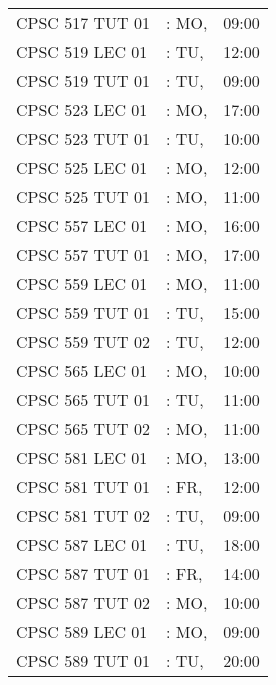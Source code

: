 \documentclass[11pt]{article}
\begin{document}
\begin{longtable}{l l r}
CPSC 517 TUT 01               &\hspace*{1.5cm}: MO,& 09:00\tabularnewline
CPSC 519 LEC 01               &\hspace*{1.5cm}: TU,& 12:00\tabularnewline
CPSC 519 TUT 01               &\hspace*{1.5cm}: TU,& 09:00\tabularnewline
CPSC 523 LEC 01               &\hspace*{1.5cm}: MO,& 17:00\tabularnewline
CPSC 523 TUT 01               &\hspace*{1.5cm}: TU,& 10:00\tabularnewline
CPSC 525 LEC 01               &\hspace*{1.5cm}: MO,& 12:00\tabularnewline
CPSC 525 TUT 01               &\hspace*{1.5cm}: MO,& 11:00\tabularnewline
CPSC 557 LEC 01               &\hspace*{1.5cm}: MO,& 16:00\tabularnewline
CPSC 557 TUT 01               &\hspace*{1.5cm}: MO,& 17:00\tabularnewline
CPSC 559 LEC 01               &\hspace*{1.5cm}: MO,& 11:00\tabularnewline
CPSC 559 TUT 01               &\hspace*{1.5cm}: TU,& 15:00\tabularnewline
CPSC 559 TUT 02               &\hspace*{1.5cm}: TU,& 12:00\tabularnewline
CPSC 565 LEC 01               &\hspace*{1.5cm}: MO,& 10:00\tabularnewline
CPSC 565 TUT 01               &\hspace*{1.5cm}: TU,& 11:00\tabularnewline
CPSC 565 TUT 02               &\hspace*{1.5cm}: MO,& 11:00\tabularnewline
CPSC 581 LEC 01               &\hspace*{1.5cm}: MO,& 13:00\tabularnewline
CPSC 581 TUT 01               &\hspace*{1.5cm}: FR,& 12:00\tabularnewline
CPSC 581 TUT 02               &\hspace*{1.5cm}: TU,& 09:00\tabularnewline
CPSC 587 LEC 01               &\hspace*{1.5cm}: TU,& 18:00\tabularnewline
CPSC 587 TUT 01               &\hspace*{1.5cm}: FR,& 14:00\tabularnewline
CPSC 587 TUT 02               &\hspace*{1.5cm}: MO,& 10:00\tabularnewline
CPSC 589 LEC 01               &\hspace*{1.5cm}: MO,& 09:00\tabularnewline
CPSC 589 TUT 01               &\hspace*{1.5cm}: TU,& 20:00\tabularnewline

\end{longtable}
\end{document}
